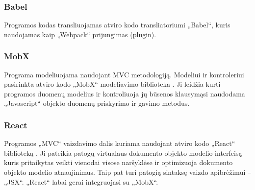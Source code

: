 \subsubsection{Babel}

Programos kodas transliuojamas atviro kodo transliatoriumi „Babel“, kuris naudojamas kaip „Webpack“ prijungimas (plugin).


\subsubsection{MobX}

Programa modeliuojama naudojant MVC metodologiją. Modeliui ir kontroleriui pasirinkta atviro kodo „MobX“ modeliavimo biblioteka \cite{githubMobX}. Ji leidžia kurti programos duomenų modelius ir kontroliuoja jų būsenos klausymąsi naudodama „Javascript“ objekto duomenų priskyrimo ir gavimo metodus.

\subsubsection{React}

Programos „MVC“ vaizdavimo dalis kuriama naudojant atviro kodo „React“ biblioteką \cite{reactJs}. Ji pateikia patogų virtualaus dokumento objekto modelio interfeisą kuris pritaikytas veikti vienodai visose naršyklėse ir optimizuoja dokumento objekto modelio atnaujinimus. Taip pat turi patogią sintaksę vaizdo apibrėžimui – „JSX“. „React“ labai gerai integruojasi su „MobX“.
